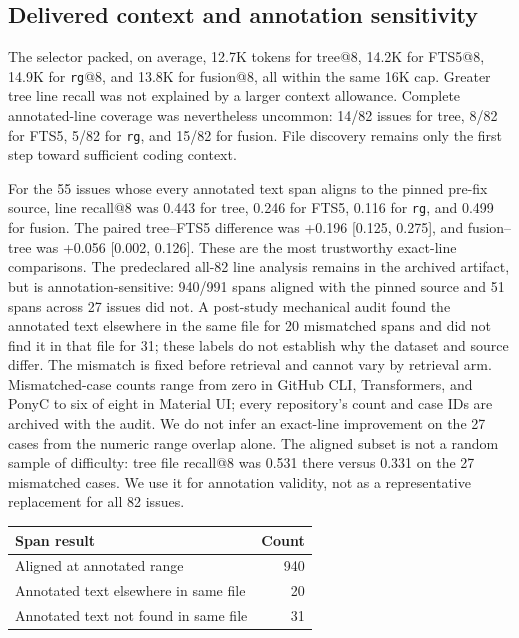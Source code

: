\documentclass[
]{article}
\begin{document}
\subsection{Delivered context and annotation
sensitivity}\label{delivered-context-and-annotation-sensitivity}

The selector packed, on average, 12.7K tokens for tree@8, 14.2K for
FTS5@8, 14.9K for \texttt{rg}@8, and 13.8K for fusion@8, all within the
same 16K cap. Greater tree line recall was not explained by a larger
context allowance. Complete annotated-line coverage was nevertheless
uncommon: 14/82 issues for tree, 8/82 for FTS5, 5/82 for \texttt{rg},
and 15/82 for fusion. File discovery remains only the first step toward
sufficient coding context.

For the 55 issues whose every annotated text span aligns to the pinned
pre-fix source, line recall@8 was 0.443 for tree, 0.246 for FTS5, 0.116
for \texttt{rg}, and 0.499 for fusion. The paired tree--FTS5 difference
was +0.196 {[}0.125, 0.275{]}, and fusion--tree was +0.056 {[}0.002,
0.126{]}. These are the most trustworthy exact-line comparisons. The
predeclared all-82 line analysis remains in the archived artifact, but
is annotation-sensitive: 940/991 spans
aligned with the pinned source and 51 spans across 27 issues did not.
A post-study mechanical audit found the annotated text elsewhere in the
same file for 20 mismatched spans and did not find it in that file for
31; these labels do not establish why the dataset and source differ.
The mismatch is fixed before retrieval and cannot vary by retrieval
arm. Mismatched-case counts range from zero in GitHub CLI,
Transformers, and PonyC to six of eight in Material UI; every
repository's count and case IDs are archived with the audit. We do not
infer an exact-line improvement on the 27 cases from
the numeric range overlap alone. The aligned subset is not a random
sample of difficulty: tree file recall@8 was 0.531 there versus 0.331
on the 27 mismatched cases. We use it for annotation validity, not as
a representative replacement for all 82 issues.

\label{tab:annotation-audit}
\begin{center}
\begin{tabular}{lr}
\toprule
Span result & Count \\
\midrule
Aligned at annotated range & 940 \\
Annotated text elsewhere in same file & 20 \\
Annotated text not found in same file & 31 \\
\bottomrule
\end{tabular}
\end{center}
\end{document}
